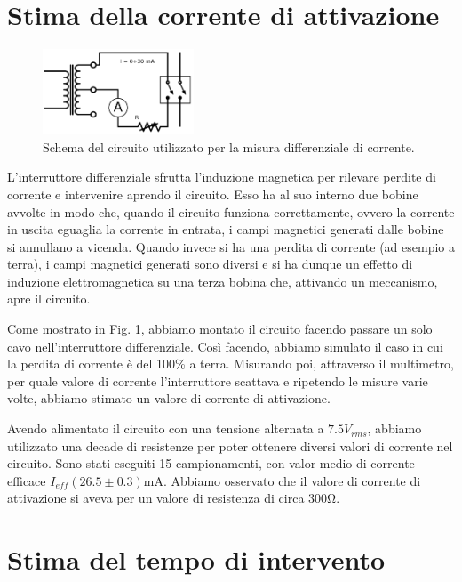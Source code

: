\section{Stima della corrente di attivazione}

\begin{figure}
	\centering
    \includegraphics[width=0.40\textwidth]{amper.pdf}
    \caption{Schema del circuito utilizzato per la misura differenziale di corrente.}
    \label{fig:amper}
\end{figure}

L'interruttore differenziale sfrutta l'induzione magnetica per rilevare perdite di corrente e intervenire aprendo il circuito. Esso ha al suo interno due bobine avvolte in modo che, quando il circuito funziona correttamente, ovvero la corrente in uscita eguaglia la corrente in entrata, i campi magnetici generati dalle bobine si annullano a vicenda. Quando invece si ha una perdita di corrente (ad esempio a terra), i campi magnetici generati sono diversi e si ha dunque un effetto di induzione elettromagnetica su una terza bobina che, attivando un meccanismo, apre il circuito.

Come mostrato in Fig. \ref{fig:amper}, abbiamo montato il circuito facendo passare un solo cavo nell'interruttore differenziale. Così facendo, abbiamo simulato il caso in cui la perdita di corrente è del 100\% a terra. Misurando poi, attraverso il multimetro, per quale valore di corrente l'interruttore scattava e ripetendo le misure varie volte, abbiamo stimato un valore di corrente di attivazione. 

Avendo alimentato il circuito con una tensione alternata a $7.5V_{rms}$, abbiamo utilizzato una decade di resistenze per poter ottenere diversi valori di corrente nel circuito. Sono stati eseguiti 15 campionamenti, con valor medio di corrente efficace $I_{eff} (26.5\pm0.3)\si{\milli\ampere}$. Abbiamo osservato che il valore di corrente di attivazione si aveva per un valore di resistenza di circa $300\si{\ohm}$. 


\section{Stima del tempo di intervento}

